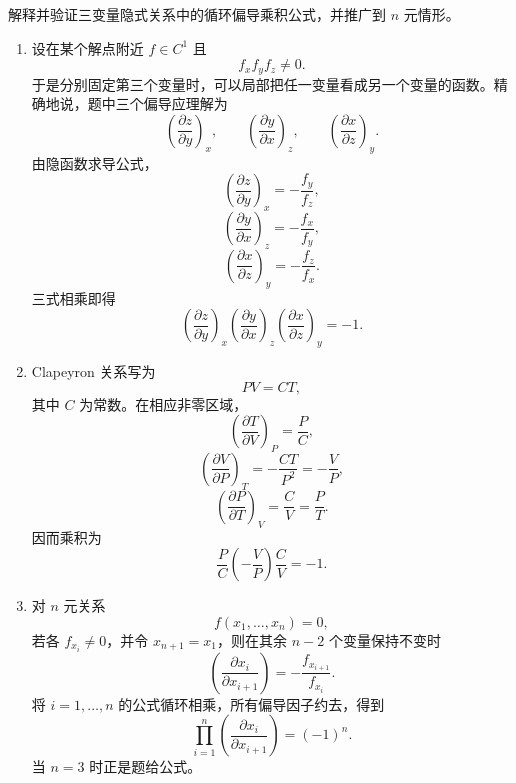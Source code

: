 \begin{xreferenceproblem}[20.5.2 第一组参考题 9]
解释并验证三变量隐式关系中的循环偏导乘积公式，并推广到 $n$ 元情形。
\end{xreferenceproblem}
\begin{xsolution}
\begin{enumerate}[label=(\arabic*)]
  \item 设在某个解点附近 $f\in C^1$ 且
  \[
    f_xf_yf_z\ne0.
  \]
  于是分别固定第三个变量时，可以局部把任一变量看成另一个变量的函数。精确地说，题中三个偏导应理解为
  \[
    \left(\frac{\partial z}{\partial y}\right)_x,
    \qquad
    \left(\frac{\partial y}{\partial x}\right)_z,
    \qquad
    \left(\frac{\partial x}{\partial z}\right)_y.
  \]
  由隐函数求导公式，
  \[
    \left(\frac{\partial z}{\partial y}\right)_x=-\frac{f_y}{f_z},
  \]
  \[
    \left(\frac{\partial y}{\partial x}\right)_z=-\frac{f_x}{f_y},
  \]
  \[
    \left(\frac{\partial x}{\partial z}\right)_y=-\frac{f_z}{f_x}.
  \]
  三式相乘即得
  \[
    \boxed{\displaystyle
    \left(\frac{\partial z}{\partial y}\right)_x
    \left(\frac{\partial y}{\partial x}\right)_z
    \left(\frac{\partial x}{\partial z}\right)_y=-1}.
  \]

  \item Clapeyron 关系写为
  \[
    PV=CT,
  \]
  其中 $C$ 为常数。在相应非零区域，
  \[
    \left(\frac{\partial T}{\partial V}\right)_P=\frac PC,
  \]
  \[
    \left(\frac{\partial V}{\partial P}\right)_T=-\frac{CT}{P^2}=-\frac VP,
  \]
  \[
    \left(\frac{\partial P}{\partial T}\right)_V=\frac CV=\frac PT.
  \]
  因而乘积为
  \[
    \frac PC\left(-\frac VP\right)\frac CV=-1.
  \]

  \item 对 $n$ 元关系
  \[
    f(x_1,\ldots,x_n)=0,
  \]
  若各 $f_{x_i}\ne0$，并令 $x_{n+1}=x_1$，则在其余 $n-2$ 个变量保持不变时
  \[
    \left(\frac{\partial x_i}{\partial x_{i+1}}\right)
    =-\frac{f_{x_{i+1}}}{f_{x_i}}.
  \]
  将 $i=1,\ldots,n$ 的公式循环相乘，所有偏导因子约去，得到
  \[
    \boxed{\displaystyle
      \prod_{i=1}^n
      \left(\frac{\partial x_i}{\partial x_{i+1}}\right)
      =(-1)^n}.
  \]
  当 $n=3$ 时正是题给公式。
\end{enumerate}
\end{xsolution}

